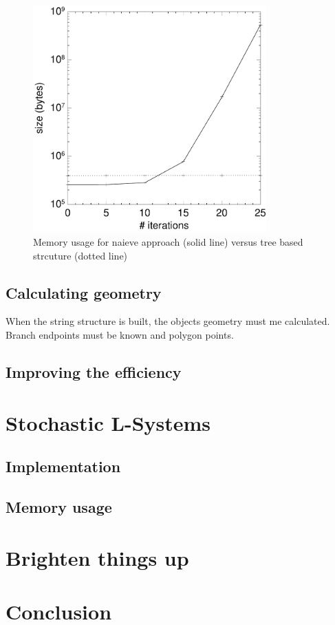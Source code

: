 \documentclass[11pt,a4paper]{article}
\begin{document}
\begin{figure}[h!]
  \centering
  \includegraphics[width=0.8\textwidth]{bench.pdf}
  \caption{Memory usage for naieve approach (solid line) versus tree based strcuture (dotted line)}
  \label{fig:bench}
\end{figure}

\subsection{Calculating geometry}

When the string structure is built, the objects geometry must me calculated. Branch endpoints must be known and polygon points.

\subsection{Improving the efficiency}


\section{Stochastic L-Systems} %
\subsection{Implementation}
\subsection{Memory usage}

\section{Brighten things up} %


\section{Conclusion}

\newpage
\begin{appendix}
\listoffigures
\end{appendix}
\end{document}
